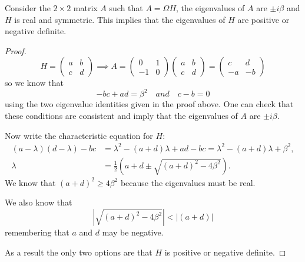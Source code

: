 \begin{lemma}Consider the $2 \times 2$ matrix $A$ such that $A=\Omega H$, the eigenvalues of $A$ are $\pm i \beta$ and $H$ is real and symmetric. This implies that the eigenvalues of $H$ are positive or negative definite. \label{lem:atoh}
\end{lemma}
\begin{proof}
\begin{equation}
H = \begin{pmatrix} a & b \\ c & d \end{pmatrix} \implies A = \begin{pmatrix} 0 & 1 \\ -1 & 0 \end{pmatrix} \begin{pmatrix} a & b \\ c & d \end{pmatrix} = \begin{pmatrix} c & d \\ -a & -b \end{pmatrix}
\end{equation}
so we know that
\begin{equation}
-bc+ad = \beta^2 \quad and \quad c-b=0
\end{equation}
using the two eigenvalue identities given in the proof above. One can check that these conditions are consistent and imply that the eigenvalues of $A$ are $\pm i \beta$.

Now write the characteristic equation for $H$:
\begin{equation}
\begin{aligned}
(a-\lambda)(d-\lambda) - bc &= \lambda^2-(a+d)\lambda +ad - bc = \lambda^2 - (a+d)\lambda + \beta^2, \\
\lambda &= \frac{1}{2}\left(a+d \pm \sqrt{(a+d)^2-4\beta^2}\right).
\end{aligned}
\end{equation}
We know that $(a+d)^2 \geq 4\beta^2$ because the eigenvalues must be real.

We also know that
\begin{equation}
| \sqrt{(a+d)^2 - 4\beta^2} | < |(a+d)|
\end{equation}
remembering that $a$ and $d$ may be negative.

As a result the only two options are that $H$ is positive or negative definite.
\end{proof}

